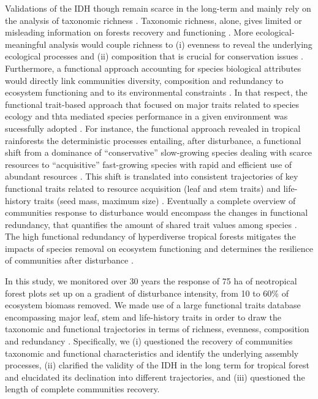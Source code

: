 \documentclass[fleqn,10pt]{ArtEcoFoG} %
\begin{document}
Validations of the IDH though remain scarce in the long-term and mainly
rely on the analysis of taxonomic richness \citep{Molino2001}. Taxonomic
richness, alone, gives limited or misleading information on forests
recovery and functioning \citep{Martin2015, Chaudhary2016}. More
ecological-meaningful analysis would couple richness to (i) evenness to
reveal the underlying ecological processes and (ii) composition that is
crucial for conservation issues
\citep{Magurran1988, Lavorel2002, Bellwood2006}. Furthermore, a
functional approach accounting for species biological attributes would
directly link communities diversity, composition and redundancy to
ecosystem functioning and to its environmental constraints
\citep{Violle2007b, Moretti2009, Baraloto2012a, Scheiter2013}. In that
respect, the functional trait-based approach that focused on major
traits related to species ecology and thta mediated species performance
in a given environment was sucessfully adopted
\citep{Diaz2005, Villeger2008a}. For instance, the functional approach
revealed in tropical rainforests the deterministic processes entailing,
after disturbance, a functional shift from a dominance of
``conservative'' slow-growing species dealing with scarce resources to
``acquisitive'' fast-growing species with rapid and efficient use of
abundant resources \citep{TerSteege2001, Reich2014, Herault2011}. This
shift is translated into consistent trajectories of key functional
traits related to resource acquisition (leaf and stem traits) and
life-history traits (seed mass, maximum size)
\citep{Wright2004, TerSteege2006, Westoby2006a, Chave2009b}. Eventually
a complete overview of communities response to disturbance would
encompass the changes in functional redundancy, that quantifies the
amount of shared trait values among species \citep{Carmona2016}. The
high functional redundancy of hyperdiverse tropical forests
\citep{Bellwood2006} mitigates the impacts of species removal on
ecosystem functioning and determines the resilience of communities after
disturbance \citep{Trenbath1999, Elmqvist2003, Diaz2005}.

In this study, we monitored over 30 years the response of 75 ha of
neotropical forest plots set up on a gradient of disturbance intensity,
from 10 to 60\% of ecosystem biomass removed. We made use of a large
functional traits database encompassing major leaf, stem and
life-history traits in order to draw the taxonomic and functional
trajectories in terms of richness, evenness, composition and redundancy
\citep{Lohbeck2015, Guariguata2001}. Specifically, we (i) questioned the
recovery of communities taxonomic and functional characteristics and
identify the underlying assembly processes, (ii) clarified the validity
of the IDH in the long term for tropical forest and elucidated its
declination into different trajectories, and (iii) questioned the length
of complete communities recovery.
\end{document}
